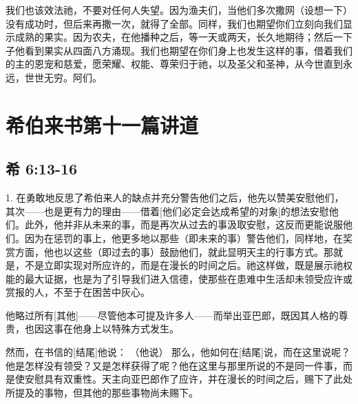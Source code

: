 我们也该效法祂，不要对任何人失望。因为渔夫们，当他们多次撒网（设想一下）没有成功时，但后来再撒一次，就得了全部。同样，我们也期望你们立刻向我们显示成熟的果实。因为农夫，在他播种之后，等一天或两天，长久地期待；然后一下子他看到果实从四面八方涌现。我们也期望在你们身上也发生这样的事，借着我们的主的恩宠和慈爱，愿荣耀、权能、尊荣归于祂，以及圣父和圣神，从今世直到永远，世世无穷。阿们。\par



\section{希伯来书第十一篇讲道}


\subsection{希 6:13-16}

\par

1. 在勇敢地反思了希伯来人的缺点并充分警告他们之后，他先以赞美安慰他们，其次——也是更有力的理由——借着[他们必定会达成希望的对象]的想法安慰他们。此外，他并非从未来的事，而是再次从过去的事汲取安慰，这反而更能说服他们。因为在惩罚的事上，他更多地以那些（即未来的事）警告他们，同样地，在奖赏方面，他也以这些（即过去的事）鼓励他们，就此显明天主的行事方式。那就是，不是立即实现对所应许的，而是在漫长的时间之后。祂这样做，既是展示祂权能的最大证据，也是为了引导我们进入信德，使那些在患难中生活却未领受应许或赏报的人，不至于在困苦中灰心。\par

他略过所有[其他]——尽管他本可提及许多人——而举出亚巴郎，既因其人格的尊贵，也因这事在他身上以特殊方式发生。\par

然而，在书信的[结尾]他说： （他说） 那么，他如何在[结尾]说，而在这里说呢？他是怎样没有领受？又是怎样获得了呢？他在这里与那里所说的不是同一件事，而是使安慰具有双重性。天主向亚巴郎作了应许，并在漫长的时间之后，赐下了此处所提及的事物，但其他的那些事物尚未赐下。\par

